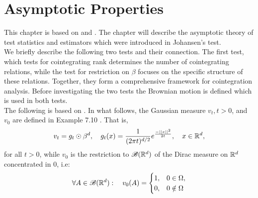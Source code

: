 \chapter{Asymptotic Properties}
This chapter is based on \cite{Statistica_analysis_of_cointegrating_vectors} and \cite{Modelling_of_cointegration_in_the_vector_autoregressive_model}. The chapter will describe the asymptotic theory of test statistics and estimators which were introduced in Johansen's test.\\

\noindent We briefly describe the following two tests and their connection. The first test, which tests for cointegrating rank determines the number of cointegrating relations, while the test for restriction on $\beta$ focuses on the specific structure of these relations. Together, they form a comprehensive framework for cointegration analysis. Before investigating the two tests the Brownian motion is defined which is used in both tests.\\

\noindent 
The following is based on \cite{Measure_theory_integration_theory_and_stochastic_processes}. In what follows, the Gaussian measure $v_t, t>0$, and $v_0$ are defined in Example 7.10 \cite{Measure_theory_integration_theory_and_stochastic_processes}. That is,
\begin{equation*}
    v_t=g_t \odot \beta^d, \quad g_t(x)=\frac{1}{(2\pi t)^{d/2}}e^{\frac{-||x||^2}{2t}}, \quad x\in \mathbb{R}^d,
\end{equation*}
for all $t>0$, while $v_0$ is the restriction to $\mathscr{B}(\mathbb{R}^d)$ of the Dirac measure on $\mathbb{R}^d$ concentrated in 0, i.e:
\begin{equation*}
    \forall A \in \mathscr{B}(\mathbb{R}^d): \quad v_0(A)=\begin{cases} 
1,& 0 \in \Omega, \\
0,& 0 \notin \Omega
\end{cases}
\end{equation*}

